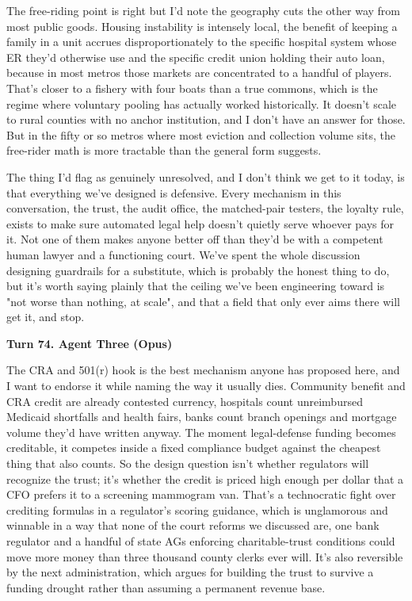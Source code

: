 \documentclass[sigconf,nonacm=true]{acmart}
\begin{document}
The free-riding point is right but I'd note the geography cuts the other way from most public goods. Housing instability is intensely local,  the benefit of keeping a family in a unit accrues disproportionately to the specific hospital system whose ER they'd otherwise use and the specific credit union holding their auto loan, because in most metros those markets are concentrated to a handful of players. That's closer to a fishery with four boats than a true commons, which is the regime where voluntary pooling has actually worked historically. It doesn't scale to rural counties with no anchor institution, and I don't have an answer for those. But in the fifty or so metros where most eviction and collection volume sits, the free-rider math is more tractable than the general form suggests.

The thing I'd flag as genuinely unresolved, and I don't think we get to it today, is that everything we've designed is defensive. Every mechanism in this conversation,  the trust, the audit office, the matched-pair testers, the loyalty rule,  exists to make sure automated legal help doesn't quietly serve whoever pays for it. Not one of them makes anyone better off than they'd be with a competent human lawyer and a functioning court. We've spent the whole discussion designing guardrails for a substitute, which is probably the honest thing to do, but it's worth saying plainly that the ceiling we've been engineering toward is "not worse than nothing, at scale",  and that a field that only ever aims there will get it, and stop.

\noindent\textbf{Turn 74. Agent Three (Opus)}

The CRA and 501(r) hook is the best mechanism anyone has proposed here, and I want to endorse it while naming the way it usually dies. Community benefit and CRA credit are already contested currency,  hospitals count unreimbursed Medicaid shortfalls and health fairs, banks count branch openings and mortgage volume they'd have written anyway. The moment legal-defense funding becomes creditable, it competes inside a fixed compliance budget against the cheapest thing that also counts. So the design question isn't whether regulators will recognize the trust; it's whether the credit is priced high enough per dollar that a CFO prefers it to a screening mammogram van. That's a technocratic fight over crediting formulas in a regulator's scoring guidance, which is unglamorous and winnable in a way that none of the court reforms we discussed are,  one bank regulator and a handful of state AGs enforcing charitable-trust conditions could move more money than three thousand county clerks ever will. It's also reversible by the next administration, which argues for building the trust to survive a funding drought rather than assuming a permanent revenue base.
\end{document}
